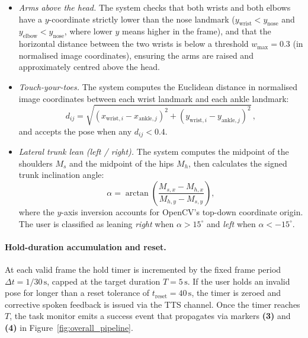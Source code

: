 \begin{itemize}
\item \textit{Arms above the head.} The system checks that both wrists and both elbows have a $y$-coordinate strictly lower than the nose landmark ($y_\text{wrist} < y_\text{nose}$ and $y_\text{elbow} < y_\text{nose}$, where lower $y$ means higher in the frame), and that the horizontal distance between the two wrists is below a threshold $w_\text{max} = 0.3$ (in normalised image coordinates), ensuring the arms are raised and approximately centred above the head.

\item \textit{Touch-your-toes.} The system computes the Euclidean distance in normalised image coordinates between each wrist landmark and each ankle landmark:
\begin{equation}
d_{ij} = \sqrt{(x_{\text{wrist},i} - x_{\text{ankle},j})^2 + (y_{\text{wrist},i} - y_{\text{ankle},j})^2}\,,
\label{eq:toe_distance}
\end{equation}
and accepts the pose when any $d_{ij} < 0.4$.

\item \textit{Lateral trunk lean (left / right).} The system computes the midpoint of the shoulders $M_s$ and the midpoint of the hips $M_h$, then calculates the signed trunk inclination angle:
\begin{equation}
\alpha = \arctan\!\left(\frac{M_{s,x} - M_{h,x}}{M_{h,y} - M_{s,y}}\right),
\label{eq:trunk_angle}
\end{equation}
where the $y$-axis inversion accounts for OpenCV's top-down coordinate origin. The user is classified as leaning \textit{right} when $\alpha > 15^\circ$ and \textit{left} when $\alpha < -15^\circ$.
\end{itemize}

\paragraph{Hold-duration accumulation and reset.}
At each valid frame the hold timer is incremented by the fixed frame period $\Delta t = 1/30\,\text{s}$, capped at the target duration $T = 5\,\text{s}$. If the user holds an invalid pose for longer than a reset tolerance of $t_\text{reset} = 40\,\text{s}$, the timer is zeroed and corrective spoken feedback is issued via the TTS channel. Once the timer reaches $T$, the task monitor emits a success event that propagates via markers \textbf{(3)} and \textbf{(4)} in Figure~\ref{fig:overall_pipeline}.

